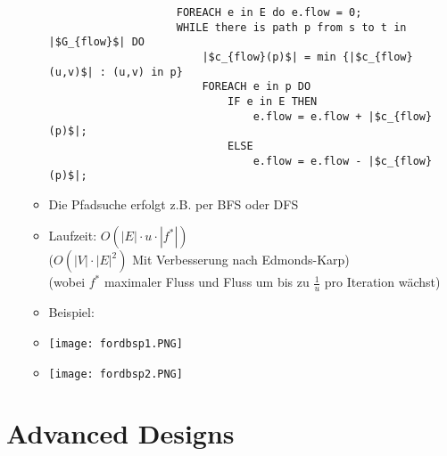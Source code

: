 \begin{itemize}
\begin{itemize}
\begin{verbatim}
                    FOREACH e in E do e.flow = 0;
                    WHILE there is path p from s to t in |$G_{flow}$| DO
                        |$c_{flow}(p)$| = min {|$c_{flow}(u,v)$| : (u,v) in p}
                        FOREACH e in p DO
                            IF e in E THEN
                                e.flow = e.flow + |$c_{flow}(p)$|;
                            ELSE
                                e.flow = e.flow - |$c_{flow}(p)$|;
                    \end{verbatim}
                \item Die Pfadsuche erfolgt z.B. per BFS oder DFS
                \item Laufzeit: $O(|E| \cdot u \cdot |f^*|)$ \\
                        ($O(|V| \cdot |E|^2)$ Mit Verbesserung nach Edmonds-Karp) \\
                        (wobei $f^*$ maximaler Fluss und Fluss um bis zu $\frac{1}{u}$ pro Iteration wächst)
\pagebreak
                \item Beispiel:
                \item[] \texttt{[image: fordbsp1.PNG]}
                \item[] \texttt{[image: fordbsp2.PNG]}
            \end{itemize}
    \end{itemize}

\section{Advanced Designs}
